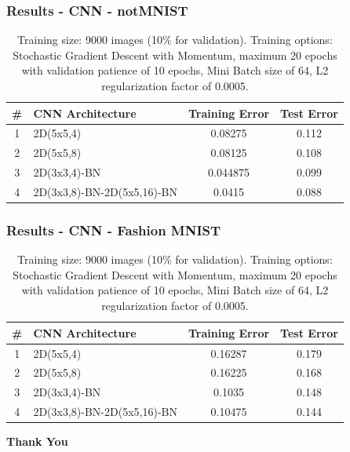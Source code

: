 \documentclass{beamer}
\begin{document}
\begin{frame}
\frametitle{Results - CNN - notMNIST}
\begin{table}[hbt]
  \begin{tabular}{|c|l|c|c|}
  	\hline
    \# & CNN Architecture & Training Error & Test Error\\
    \hline
    \hline
       1 & 2D(5x5,4)     &              0.08275   &  0.112  \\   
   2 & 2D(5x5,8)   &         0.08125     &0.108  \\   
    3 & 2D(3x3,4)-BN     &       0.044875    & 0.099 \\    
    4 & 2D(3x3,8)-BN-2D(5x5,16)-BN     &        0.0415    & 0.088   \\
    \hline
  \end{tabular}
  \vspace{2em}
  \caption{{Training size: 9000 images (10\% for validation). Training options: Stochastic Gradient Descent with Momentum, maximum 20 epochs with validation patience of 10 epochs, Mini Batch size of 64, L2 regularization factor of 0.0005.}}
\end{table}
\end{frame}

\begin{frame}
\frametitle{Results - CNN - Fashion MNIST}
\begin{table}[hbt]
  \begin{tabular}{|c|l|c|c|}
  	\hline
    \# & CNN Architecture & Training Error & Test Error\\
    \hline
    \hline
    1 & 2D(5x5,4)   &             0.16287    &  0.179     \\
    2 & 2D(5x5,8)   &            0.16225     & 0.168     \\
   3 & 2D(3x3,4)-BN   &           0.1035      &0.148   \\  
    4 & 2D(3x3,8)-BN-2D(5x5,16)-BN    &           0.10475      &0.144  \\
    \hline
  \end{tabular}
  \vspace{2em}
  \caption{{Training size: 9000 images (10\% for validation). Training options: Stochastic Gradient Descent with Momentum, maximum 20 epochs with validation patience of 10 epochs, Mini Batch size of 64, L2 regularization factor of 0.0005.}}
\end{table}
\end{frame}

\begin{frame}[standout]
	\centering
	\textbf{Thank You}
\end{frame}
\end{document}
